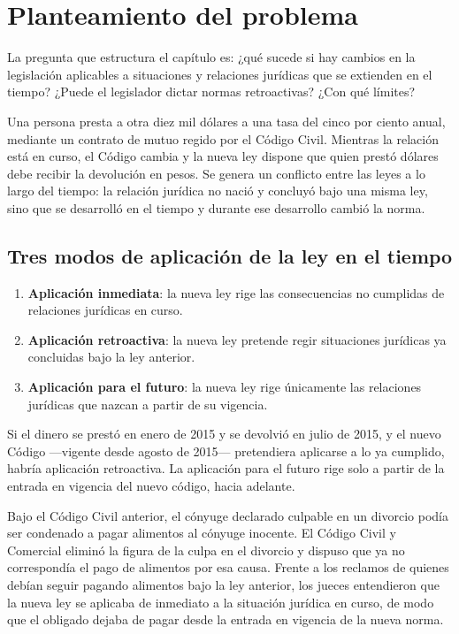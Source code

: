 \documentclass[12pt,oneside]{book}
\begin{document}
\section{Planteamiento del problema}

La pregunta que estructura el capítulo es: ¿qué sucede si hay cambios en la legislación aplicables a situaciones y relaciones jurídicas que se extienden en el tiempo? ¿Puede el legislador dictar normas retroactivas? ¿Con qué límites?

\begin{ejemplo}
Una persona presta a otra diez mil dólares a una tasa del cinco por ciento anual, mediante un contrato de mutuo regido por el Código Civil. Mientras la relación está en curso, el Código cambia y la nueva ley dispone que quien prestó dólares debe recibir la devolución en pesos. Se genera un conflicto entre las leyes a lo largo del tiempo: la relación jurídica no nació y concluyó bajo una misma ley, sino que se desarrolló en el tiempo y durante ese desarrollo cambió la norma.
\end{ejemplo}

\subsection{Tres modos de aplicación de la ley en el tiempo}

\begin{enumerate}
\item \textbf{Aplicación inmediata}: la nueva ley rige las consecuencias no cumplidas de relaciones jurídicas en curso.
\item \textbf{Aplicación retroactiva}: la nueva ley pretende regir situaciones jurídicas ya concluidas bajo la ley anterior.
\item \textbf{Aplicación para el futuro}: la nueva ley rige únicamente las relaciones jurídicas que nazcan a partir de su vigencia.
\end{enumerate}

\begin{ejemplo}
Si el dinero se prestó en enero de 2015 y se devolvió en julio de 2015, y el nuevo Código ---vigente desde agosto de 2015--- pretendiera aplicarse a lo ya cumplido, habría aplicación retroactiva. La aplicación para el futuro rige solo a partir de la entrada en vigencia del nuevo código, hacia adelante.
\end{ejemplo}

\begin{ejemplo}
Bajo el Código Civil anterior, el cónyuge declarado culpable en un divorcio podía ser condenado a pagar alimentos al cónyuge inocente. El Código Civil y Comercial eliminó la figura de la culpa en el divorcio y dispuso que ya no correspondía el pago de alimentos por esa causa. Frente a los reclamos de quienes debían seguir pagando alimentos bajo la ley anterior, los jueces entendieron que la nueva ley se aplicaba de inmediato a la situación jurídica en curso, de modo que el obligado dejaba de pagar desde la entrada en vigencia de la nueva norma.
\end{ejemplo}
\end{document}
